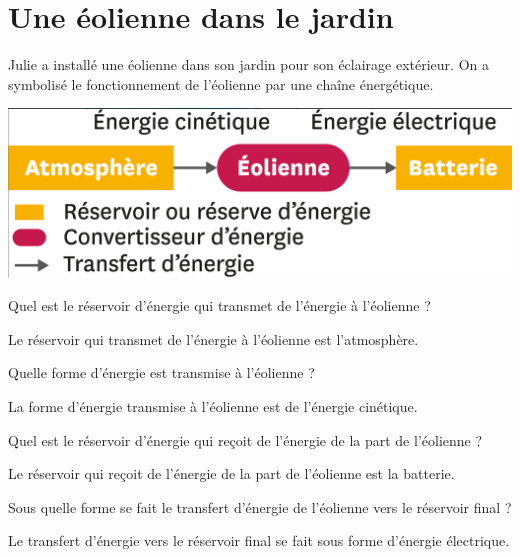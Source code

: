 \section{Une éolienne dans le jardin}\label{ex:eolienne}
	
Julie a installé une éolienne dans son jardin pour son éclairage extérieur. On a symbolisé le fonctionnement de l'éolienne par une chaîne énergétique.

\begin{center}
	\includegraphics[scale=0.2]{img/chaine}
\end{center}

\begin{questions}
	\question Quel est le réservoir d'énergie qui transmet de l'énergie à l'éolienne ?
		\begin{solution}
			Le réservoir qui transmet de l'énergie à l'éolienne est l'atmosphère.
		\end{solution}
	
	\question Quelle forme d'énergie est transmise à l'éolienne ?
		\begin{solution}
			La forme d'énergie transmise à l'éolienne est de l'énergie cinétique.
		\end{solution}
	
	
	\question Quel est le réservoir d'énergie qui reçoit de l'énergie de la part de l'éolienne ?
		\begin{solution}
			Le réservoir qui reçoit de l'énergie de la part de l'éolienne est la batterie.
		\end{solution}
	
	\question Sous quelle forme se fait le transfert d'énergie de l'éolienne vers le réservoir final ?
		\begin{solution}
			Le transfert d'énergie vers le réservoir final se fait sous forme d'énergie électrique.
		\end{solution}
\end{questions}